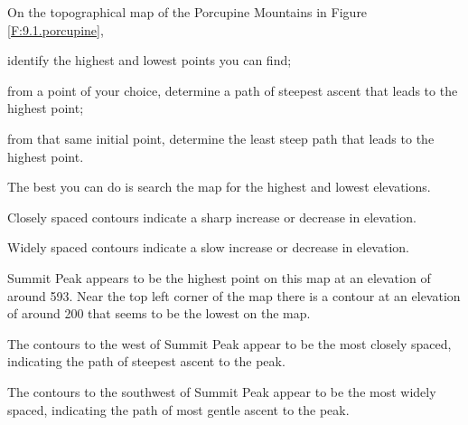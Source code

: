 \begin{activity} \label{A:9.1.8}
   On the topographical map of the Porcupine Mountains in Figure \ref{F:9.1.porcupine},

   \ba
    \item identify the highest and lowest points you can find;
    \item from a point of your choice, determine a path of steepest ascent that leads to the highest point;
    \item from that same initial point, determine the least steep path that leads to the highest point.

     \ea

\end{activity}
\begin{smallhint}

\end{smallhint}
\begin{bighint}
\ba
\item The best you can do is search the map for the highest and lowest elevations.
\item Closely spaced contours indicate a sharp increase or decrease in elevation.
\item Widely spaced contours indicate a slow increase or decrease in elevation. 
\ea
\end{bighint}
\begin{activitySolution}
\ba
\item Summit Peak appears to be the highest point on this map at an elevation of around 593. Near the top left corner of the map there is a contour at an elevation of around 200 that seems to be the lowest on the map. 
\item The contours to the west of Summit Peak appear to be the most closely spaced, indicating the path of steepest ascent to the peak.
\item The contours to the southwest of Summit Peak appear to be the most widely spaced, indicating the path of most gentle ascent to the peak.
\ea
\end{activitySolution}


\aftera 